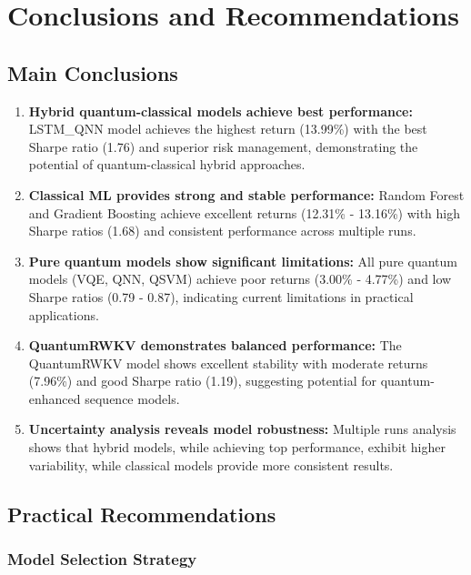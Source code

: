 \documentclass[12pt,a4paper]{article}
\begin{document}
\section{Conclusions and Recommendations}

\subsection{Main Conclusions}

\begin{enumerate}
    \item \textbf{Hybrid quantum-classical models achieve best performance:} LSTM\_QNN model achieves the highest return (13.99\%) with the best Sharpe ratio (1.76) and superior risk management, demonstrating the potential of quantum-classical hybrid approaches.
    
    \item \textbf{Classical ML provides strong and stable performance:} Random Forest and Gradient Boosting achieve excellent returns (12.31\% - 13.16\%) with high Sharpe ratios (1.68) and consistent performance across multiple runs.
    
    \item \textbf{Pure quantum models show significant limitations:} All pure quantum models (VQE, QNN, QSVM) achieve poor returns (3.00\% - 4.77\%) and low Sharpe ratios (0.79 - 0.87), indicating current limitations in practical applications.
    
    \item \textbf{QuantumRWKV demonstrates balanced performance:} The QuantumRWKV model shows excellent stability with moderate returns (7.96\%) and good Sharpe ratio (1.19), suggesting potential for quantum-enhanced sequence models.
    
    \item \textbf{Uncertainty analysis reveals model robustness:} Multiple runs analysis shows that hybrid models, while achieving top performance, exhibit higher variability, while classical models provide more consistent results.
\end{enumerate}

\subsection{Practical Recommendations}

\subsubsection{Model Selection Strategy}
\end{document}
